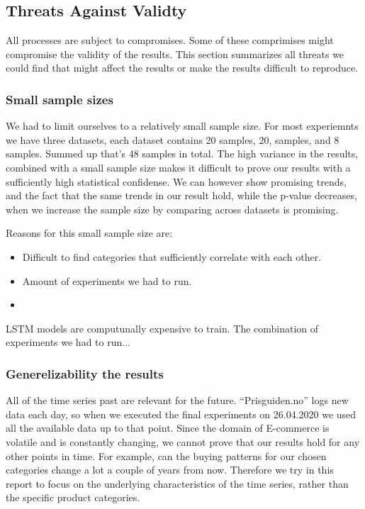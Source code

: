 \subsection{Threats Against Validty}
All processes are subject to compromises. Some of these comprimises might compromise the validity of
the results. This section summarizes all threats we could find that might affect the results or make
the results difficult to reproduce.

\subsubsection{Small sample sizes}
We had to limit ourselves to a relatively small sample size. For most experiemnts we have
three datasets, each dataset contains 20 samples, 20, samples, and 8 samples.
Summed up that's 48 samples in total. The high variance in the results, combined with a small sample size
makes it difficult to prove our results with a sufficiently high statistical confidense.
We can however show promising trends, and the fact that the same trends in our result hold, while
the p-value decreases, when
we increase the sample size by comparing across datasets is promising.


Reasons for this small sample size are:
\begin{itemize}
  \item Difficult to find categories that sufficiently correlate with each other.
  \item Amount of experiments we had to run.
  \item
\end{itemize}
LSTM models are computunally expensive to train.
The combination of experiments we had to run...


\subsubsection{Generelizability the results}
All of the time series past are relevant for the future. ``Prisguiden.no'' logs new data each day,
so when we executed the final experiments on 26.04.2020 we used all the available data up to that point.
Since the domain of E-commerce is volatile and is constantly changing, we cannot prove that our
results hold for any other points in time. For example, can the buying patterns for our chosen categories
change a lot a couple of years from now.
Therefore we try in this report to focus on the underlying characteristics of the time series, rather than
the specific product categories.

